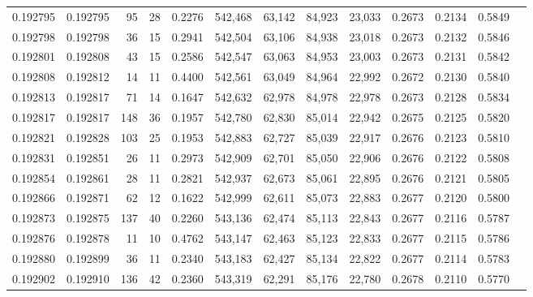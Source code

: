 \begin{tabular}{rrrrrrrrrrrrr}
0.192795 & 0.192795 &    95 &  28 &                                     0.2276 & 542,468 &  63,142 &  84,923 &  23,033 & 0.2673 & 0.2134 & 0.5849 \\
0.192798 & 0.192798 &    36 &  15 &                                     0.2941 & 542,504 &  63,106 &  84,938 &  23,018 & 0.2673 & 0.2132 & 0.5846 \\
0.192801 & 0.192808 &    43 &  15 &                                     0.2586 & 542,547 &  63,063 &  84,953 &  23,003 & 0.2673 & 0.2131 & 0.5842 \\
0.192808 & 0.192812 &    14 &  11 &                                     0.4400 & 542,561 &  63,049 &  84,964 &  22,992 & 0.2672 & 0.2130 & 0.5840 \\
0.192813 & 0.192817 &    71 &  14 &                                     0.1647 & 542,632 &  62,978 &  84,978 &  22,978 & 0.2673 & 0.2128 & 0.5834 \\
0.192817 & 0.192817 &   148 &  36 &                                     0.1957 & 542,780 &  62,830 &  85,014 &  22,942 & 0.2675 & 0.2125 & 0.5820 \\
0.192821 & 0.192828 &   103 &  25 &                                     0.1953 & 542,883 &  62,727 &  85,039 &  22,917 & 0.2676 & 0.2123 & 0.5810 \\
0.192831 & 0.192851 &    26 &  11 &                                     0.2973 & 542,909 &  62,701 &  85,050 &  22,906 & 0.2676 & 0.2122 & 0.5808 \\
0.192854 & 0.192861 &    28 &  11 &                                     0.2821 & 542,937 &  62,673 &  85,061 &  22,895 & 0.2676 & 0.2121 & 0.5805 \\
0.192866 & 0.192871 &    62 &  12 &                                     0.1622 & 542,999 &  62,611 &  85,073 &  22,883 & 0.2677 & 0.2120 & 0.5800 \\
0.192873 & 0.192875 &   137 &  40 &                                     0.2260 & 543,136 &  62,474 &  85,113 &  22,843 & 0.2677 & 0.2116 & 0.5787 \\
0.192876 & 0.192878 &    11 &  10 &                                     0.4762 & 543,147 &  62,463 &  85,123 &  22,833 & 0.2677 & 0.2115 & 0.5786 \\
0.192880 & 0.192899 &    36 &  11 &                                     0.2340 & 543,183 &  62,427 &  85,134 &  22,822 & 0.2677 & 0.2114 & 0.5783 \\
0.192902 & 0.192910 &   136 &  42 &                                     0.2360 & 543,319 &  62,291 &  85,176 &  22,780 & 0.2678 & 0.2110 & 0.5770 \\

\end{tabular}

